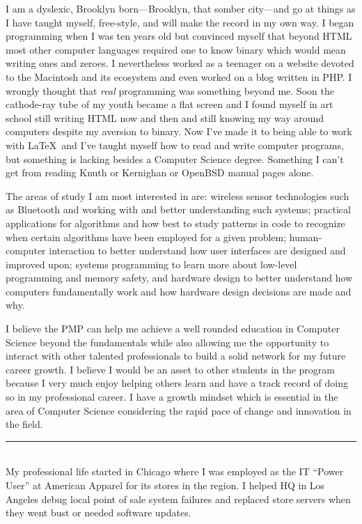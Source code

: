 \documentclass[12pt]{article}
\begin{document}
I am a dyslexic, Brooklyn born---Brooklyn, that somber city---and go at things as I have taught myself, free-style, and will make the record in my own way.
I began programming when I was ten years old but convinced myself that beyond HTML most other computer languages required one to know binary which would mean writing ones and zeroes. I nevertheless worked as a teenager on a website devoted to the Macintosh and its ecosystem and even worked on a blog written in PHP. I wrongly thought that \emph{real} programming was something beyond me. Soon the cathode-ray tube of my youth became a flat screen and I found myself in art school still writing HTML now and then and still knowing my way around computers despite my aversion to binary. Now I've made it to being able to work with \LaTeX\ and I've taught myself how to read and write computer programs, but something is lacking besides a Computer Science degree. Something I can't get from reading Knuth or Kernighan or OpenBSD manual pages alone.

The areas of study I am most interested in are: wireless sensor technologies such as Bluetooth and working with and better understanding such systems; practical applications for algorithms and how best to study patterns in code to recognize when certain algorithms have been employed for a given problem; human-computer interaction to better understand how user interfaces are designed and improved upon; systems programming to learn more about low-level programming and memory safety, and hardware design to better understand how computers fundamentally work and how hardware design decisions are made and why.

I believe the PMP can help me achieve a well rounded education in Computer Science beyond the fundamentals while also allowing me the opportunity to interact with other talented professionals to build a solid network for my future career growth. I believe I would be an asset to other students in the program because I very much enjoy helping others learn and have a track record of doing so in my professional career. I have a growth mindset which is essential in the area of Computer Science considering the rapid pace of change and innovation in the field.\\

\hrule\
\\

My professional life started in Chicago where I was employed as the IT ``Power User'' at American Apparel for its stores in the region. I helped HQ in Los Angeles debug local point of sale system failures and replaced store servers when they went bust or needed software updates.
\end{document}
